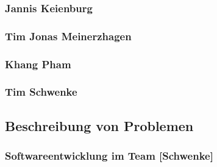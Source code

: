 \subsubsection{Jannis Keienburg}

\subsubsection{Tim Jonas Meinerzhagen}

\subsubsection{Khang Pham}

\subsubsection{Tim Schwenke}

\subsection{Beschreibung von Problemen}

\subsubsection{Softwareentwicklung im Team [Schwenke]}

